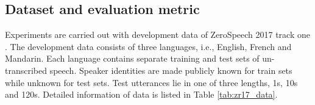 \documentclass[a4paper]{article}
\begin{document}
\subsection{Dataset and evaluation metric}
Experiments are carried out with development data of ZeroSpeech 2017 track one \cite{dunbar2017zero}.
The development data consists of three languages, i.e., English, French and Mandarin. Each language contains separate training and test sets of un-transcribed speech. Speaker identities are made publicly known for train sets while unknown for test sets. Test utterances lie in one of three lengths, 1s, 10s and 120s. Detailed information of data is listed in Table \ref{tab:zr17_data}.

\begin{table}[htbp]
\renewcommand\arraystretch{0.8}
\centering
\caption{Development data in ZeroSpeech 2017 track one}
\label{tab:zr17_data}
\end{table}
\end{document}
